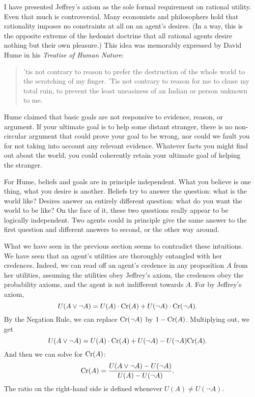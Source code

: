 I have presented Jeffrey's axiom as the sole formal requirement on
rational utility. Even that much is controversial. Many economists and
philosophers hold that rationality imposes no constraints at all on an
agent's desires. (In a way, this is the opposite extreme of the
hedonist doctrine that all rational agents desire nothing but their
own pleasure.) This idea was memorably expressed by David Hume in
his \emph{Treatise of Human Nature}:

\begin{quote}
  'tis not contrary to reason to prefer the destruction of the whole
  world to the scratching of my finger. 'Tis not contrary to reason
  for me to chuse my total ruin, to prevent the least uneasiness of an
  Indian or person unknown to me.
\end{quote}

Hume claimed that basic goals are not responsive to evidence,
reason, or argument. If your ultimate goal is to help some distant
stranger, there is no non-circular argument that could prove your goal
to be wrong, nor could we fault you for not taking into account any
relevant evidence. Whatever facts you might find out about the world,
you could coherently retain your ultimate goal of helping the
stranger.

For Hume, beliefs and goals are in principle independent. What
you believe is one thing, what you desire is another. Beliefs try to
answer the question: what is the world like? Desires answer an
entirely different question: what do you want the world to be like?
On the face of it, these two questions really appear to be logically
independent. Two agents could in principle give the same answer to the
first question and different answers to second, or the other way
around.

What we have seen in the previous section seems to contradict these
intuitions. We have seen that an agent's utilities are thoroughly
entangled with her credences. Indeed, we can read off an agent's
credence in any proposition $A$ from her utilities, assuming the 
utilities obey Jeffrey's axiom, the credences obey the probability
axioms, and the agent is not indifferent towards $A$. For by Jeffrey's
axiom,
\[
  U(A \lor \neg A) = U(A)\cdot \text{Cr}(A) + U(\neg A)\cdot \text{Cr}(\neg A).
\]
By the Negation Rule, we can replace $\text{Cr}(\neg A)$ by $1 - \text{Cr}(A)$.
Multiplying out, we get
\[
  U(A \lor \neg A) = U(A)\cdot \text{Cr}(A) + U(\neg A) - U(\neg A)\text{Cr}(A).
\]
And then we can solve for $\text{Cr}(A)$:
\[
  \text{Cr}(A) = \frac{U(A \lor \neg A) - U(\neg A)}{U(A) - U(\neg A)}.
\]
The ratio on the right-hand side is defined whenever $U(A) \not= U(\neg A)$.

